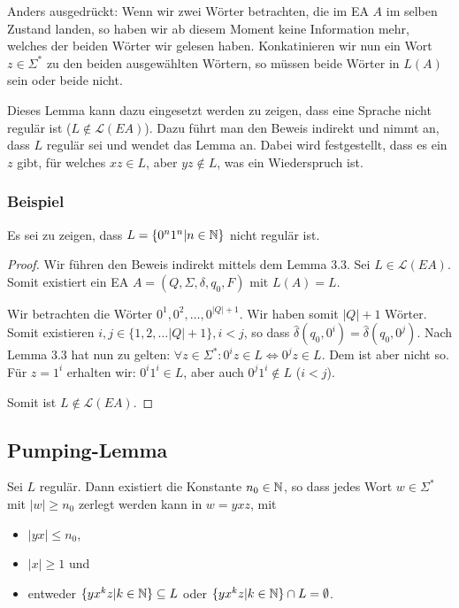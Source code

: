 Anders ausgedrückt: Wenn wir zwei Wörter betrachten, die im EA $A$ im selben Zustand landen, so haben wir ab diesem Moment keine Information mehr, welches der beiden Wörter wir gelesen haben. Konkatinieren wir nun ein Wort $z \in \Sigma^*$ zu den beiden ausgewählten Wörtern, so müssen beide Wörter in $L(A)$ sein oder beide nicht.

Dieses Lemma kann dazu eingesetzt werden zu zeigen, dass eine Sprache nicht regulär ist ($L \not\in \mathcal{L}(EA)$). Dazu führt man den Beweis indirekt und nimmt an, dass $L$ regulär sei und wendet das Lemma an. Dabei wird festgestellt, dass es ein $z$ gibt, für welches $xz \in L$, aber $yz \not\in L$, was ein Wiederspruch ist.

\subsubsection{Beispiel}
Es sei zu zeigen, dass $L = \{0^n1^n | n \in \mathbb{N}\}$ nicht regulär ist.
\begin{proof}
Wir führen den Beweis indirekt mittels dem Lemma 3.3. Sei $L \in \mathcal{L}(EA)$. Somit existiert ein EA $A = (Q, \Sigma, \delta, q_0, F)$ mit $L(A) = L$.

Wir betrachten die Wörter $0^1, 0^2, \ldots, 0^{|Q|+1}$. Wir haben somit $|Q| + 1$ Wörter. Somit existieren $i, j \in \{1, 2, \ldots |Q| + 1\}, i < j$, so dass $\hat\delta(q_0, 0^i) = \hat\delta(q_0, 0^j)$. Nach Lemma 3.3 hat nun zu gelten: $\forall z \in \Sigma^*: 0^i z \in L \Leftrightarrow 0^j z \in L$. Dem ist aber nicht so. Für $z = 1^i$ erhalten wir: $0^i 1^i \in L$, aber auch $0^j 1^i \not\in L$ ($i < j$).

Somit ist $L \not\in \mathcal{L}(EA)$.
\end{proof}

\subsection{Pumping-Lemma}
\begin{lemma}
Sei $L$ regulär. Dann existiert die Konstante $n_0 \in \mathbb{N}$, so dass jedes Wort $w \in \Sigma^*$ mit $|w| \geq n_0$ zerlegt werden kann in $w = y x z$, mit
\begin{itemize}
  \item $|yx| \leq n_0$,
  \item $|x| \geq 1$ und
  \item entweder $\{yx^kz | k \in \mathbb{N}\} \subseteq L$ oder $\{yx^kz | k \in \mathbb{N} \} \cap L = \emptyset$.
\end{itemize}

\end{lemma}


